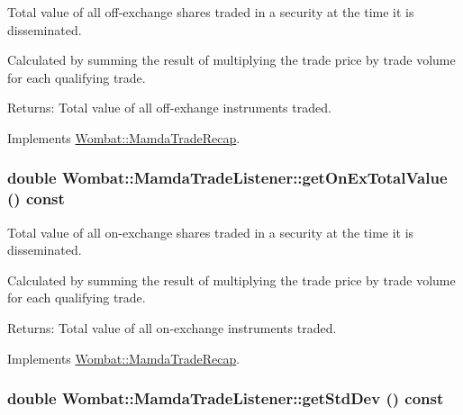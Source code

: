 Total value of all off-exchange shares traded in a security at the time it is disseminated. 

Calculated by summing the result of multiplying the trade price by trade volume for each qualifying trade.

\begin{Desc}
\item[Returns:]Total value of all off-exhange instruments traded. \end{Desc}


Implements \hyperlink{classWombat_1_1MamdaTradeRecap_96ea4f22af059b55175f2fa99696ea80}{Wombat::Mamda\-Trade\-Recap}.\hypertarget{classWombat_1_1MamdaTradeListener_b9865f1c180226bf4f9c30efb9a996ab}{
\subsubsection[getOnExTotalValue]{\setlength{\rightskip}{0pt plus 5cm}double Wombat::Mamda\-Trade\-Listener::get\-On\-Ex\-Total\-Value () const}}
\label{classWombat_1_1MamdaTradeListener_b9865f1c180226bf4f9c30efb9a996ab}


Total value of all on-exchange shares traded in a security at the time it is disseminated. 

Calculated by summing the result of multiplying the trade price by trade volume for each qualifying trade.

\begin{Desc}
\item[Returns:]Total value of all on-exchange instruments traded. \end{Desc}


Implements \hyperlink{classWombat_1_1MamdaTradeRecap_3e76017039351d288886d5f467d9364c}{Wombat::Mamda\-Trade\-Recap}.\hypertarget{classWombat_1_1MamdaTradeListener_52d70de1c585fa3d02f31fb963b2788a}{
\subsubsection[getStdDev]{\setlength{\rightskip}{0pt plus 5cm}double Wombat::Mamda\-Trade\-Listener::get\-Std\-Dev () const}}
\label{classWombat_1_1MamdaTradeListener_52d70de1c585fa3d02f31fb963b2788a}


